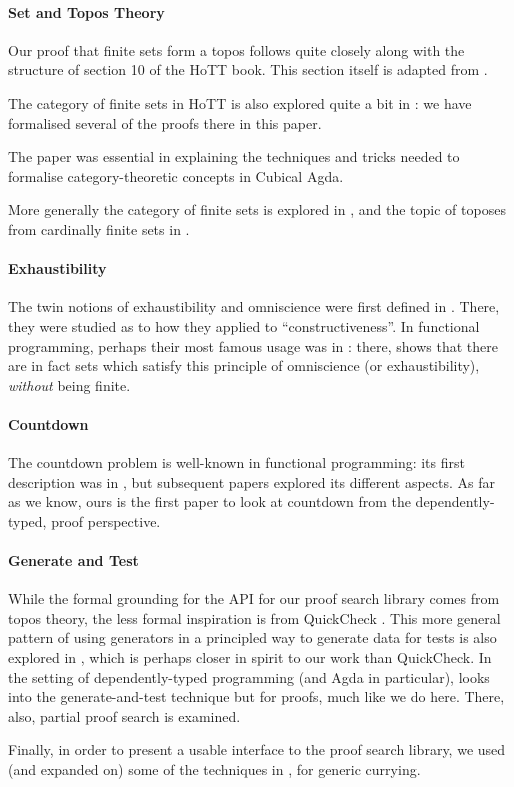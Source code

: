 \paragraph{Set and Topos Theory}
Our proof that finite sets form a topos follows quite closely along with the
structure of section 10 of the HoTT book.
This section itself is adapted from \cite{rijkeSetsHomotopyType2015}.

The category of finite sets in HoTT is also explored quite a bit in
\cite{yorgeyCombinatorialSpeciesLabelled2014}: we have formalised several of
the proofs there in this paper.

The paper \cite{iversenUnivalentCategoriesFormalization2018} was essential in
explaining the techniques and tricks needed to formalise category-theoretic
concepts in Cubical Agda.

More generally the category of finite sets is explored in
\cite{solovevCategoryFiniteSets1983}, and the topic of toposes from cardinally
finite sets in \cite{henryToposesGeneratedCardinal2018}.
\paragraph{Exhaustibility}
The twin notions of exhaustibility and omniscience were first defined in
\cite{bishopFoundationsConstructiveAnalysis1967}.
There, they were studied as to how they applied to ``constructiveness''.
In functional programming, perhaps their most famous usage was in
\cite{escardoInfiniteSetsThat2013}: there,
\citeauthor{escardoInfiniteSetsThat2013} shows that there are in fact sets which
satisfy this principle of omniscience (or exhaustibility), \emph{without} being
finite.
\paragraph{Countdown}
The countdown problem is well-known in functional programming: its first
description was in \cite{huttonCountdownProblem2002}, but subsequent papers
\cite{birdCountdownCaseStudy2005, birdFunctionalPearlTrouble2003}
explored its different aspects.
As far as we know, ours is the first paper to look at countdown from the
dependently-typed, proof perspective.
\paragraph{Generate and Test}
While the formal grounding for the API for our proof search library comes from
topos theory, the less formal inspiration is from QuickCheck
\cite{claessenQuickCheckLightweightTool2011}.
This more general pattern of using generators in a principled way to generate
data for tests is also explored in \cite{runcimanSmallCheckLazySmallCheck2008},
which is perhaps closer in spirit to our work than QuickCheck.
In the setting of dependently-typed programming (and Agda in particular),
\cite{oconnorApplicationsApplicativeProof2016} looks into the generate-and-test
technique but for proofs, much like we do here.
There, also, partial proof search is examined.

Finally, in order to present a usable interface to the proof search library, we
used (and expanded on) some of the techniques in
\cite{allaisGenericLevelPolymorphic2019}, for generic currying.

